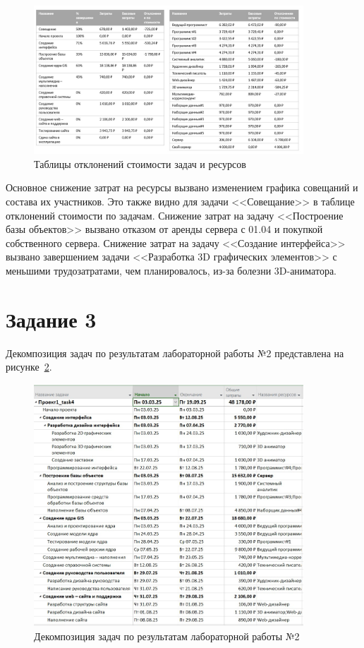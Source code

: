 \begin{figure}[H]
	\centering
	\includegraphics[width=0.9\textwidth]{img/screen4_3.jpg}
	\caption{Таблицы отклонений стоимости задач и ресурсов}
	\label{fig:screen8}
\end{figure}

Основное снижение затрат на ресурсы вызвано изменением графика совещаний и состава их участников.
Это также видно для задачи <<Совещание>> в таблице отклонений стоимости по задачам.
Снижение затрат на задачу <<Построение базы объектов>> вызвано отказом от аренды сервера с 01.04 и покупкой собственного сервера.
Снижение затрат на задачу <<Создание интерфейса>> вызвано завершением задачи <<Разработка 3D графических элементов>> с меньшими трудозатратами, чем планировалось, из-за болезни 3D-аниматора.

\section{Задание 3}

Декомпозиция задач по результатам лабораторной работы №2 представлена на рисунке~\ref{fig:screen9}.

\begin{figure}[H]
	\centering
	\includegraphics[width=0.9\textwidth]{img/screen5_1.jpg}
	\caption{Декомпозиция задач по результатам лабораторной работы №2}
	\label{fig:screen9}
\end{figure}

